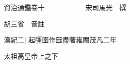






























































資治通鑑卷十　　　　　　宋司馬光　撰

胡三省　音註

漢紀二|{
	起彊圉作噩盡著雍閹茂凡二年}


太祖高皇帝上之下

